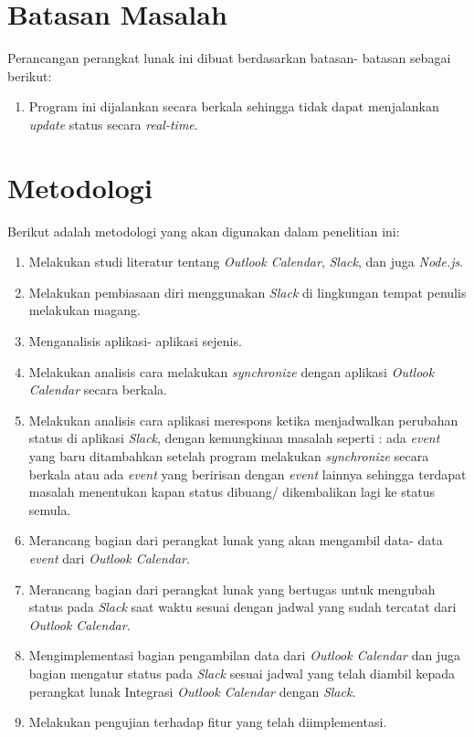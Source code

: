 \section{Batasan Masalah}
\label{sec:batasan}
Perancangan perangkat lunak ini dibuat berdasarkan batasan- batasan sebagai berikut: 
\begin{enumerate}
	\item Program ini dijalankan secara berkala sehingga tidak dapat menjalankan \textit{update} status secara \textit{real-time}. 
\end{enumerate}

\section{Metodologi}
\label{sec:metlit}
Berikut adalah metodologi yang akan digunakan dalam penelitian ini: 
\begin{enumerate}
	\item Melakukan studi literatur tentang \textit{Outlook Calendar}, \textit{Slack}, dan juga \textit{Node.js}.
	\item Melakukan pembiasaan diri menggunakan \textit{Slack} di lingkungan tempat penulis melakukan magang. 
	\item Menganalisis aplikasi- aplikasi sejenis. 
	\item Melakukan analisis cara melakukan \textit{synchronize} dengan aplikasi \textit{Outlook Calendar} secara berkala.
	\item Melakukan analisis cara aplikasi merespons ketika menjadwalkan perubahan status di aplikasi \textit{Slack}, dengan kemungkinan masalah seperti : ada \textit{event} yang baru ditambahkan setelah program melakukan \textit{synchronize} secara berkala atau ada \textit{event} yang beririsan dengan \textit{event} lainnya sehingga terdapat masalah menentukan kapan status dibuang/ dikembalikan lagi ke status semula. 
	\item Merancang bagian dari perangkat lunak yang akan mengambil data- data \textit{event} dari \textit{Outlook Calendar}. 
	\item Merancang bagian dari perangkat lunak yang bertugas untuk mengubah status pada \textit{Slack} saat waktu sesuai dengan jadwal yang sudah tercatat dari \textit{Outlook Calendar}.
	\item Mengimplementasi bagian pengambilan data dari \textit{Outlook Calendar} dan juga bagian mengatur status pada \textit{Slack} sesuai jadwal yang telah diambil kepada perangkat lunak Integrasi \textit{Outlook Calendar} dengan \textit{Slack}.
	\item Melakukan pengujian terhadap fitur yang telah diimplementasi.
\end{enumerate}

